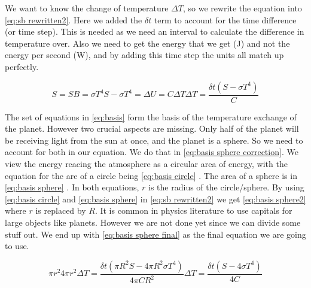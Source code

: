 We want to know the change of temperature $\Delta T$, so we rewrite the equation into \autoref{eq:sb rewritten2}. Here we added the $\delta t$ term to account for the time difference (or time 
step). This is needed as we need an interval to calculate the difference in temperature over. Also we need to get the energy that we get (\si{J}) and not the energy per second (\si{W}), and by 
adding this time step the units all match up perfectly.

\begin{subequations}
    \begin{equation}
        S = SB = \sigma T^4
        \label{eq:stefan-boltzmann}
    \end{equation}
    \begin{equation}
        S - \sigma T^4 = \Delta U = C \Delta T
        \label{eq:sb rewritten}
    \end{equation}
    \begin{equation}
        \Delta T = \frac{\delta t(S - \sigma T^4)}{C}
        \label{eq:sb rewritten2}
    \end{equation}
    \label{eq:basis}
\end{subequations}

The set of equations in \autoref{eq:basis} form the basis of the temperature exchange of the planet. However two crucial aspects are missing. Only half of the planet will be receiving light from 
the sun at once, and the planet is a sphere. So we need to account for both in our equation. We do that in \autoref{eq:basis sphere correction}. We view the energy reacing the atmosphere as a 
circular area of energy, with the equation for the are of a circle being \autoref{eq:basis circle} \cite{areaCircle}. The area of a sphere is in \autoref{eq:basis sphere} \cite{areaSphere}. In 
both equations, $r$ is the radius of the circle/sphere. By using \autoref{eq:basis circle} and \autoref{eq:basis sphere} in \autoref{eq:sb rewritten2} we get \autoref{eq:basis sphere2} where 
$r$ is replaced by $R$. It is common in physics literature to use capitals for large objects like planets. However we are not done yet since we can divide some stuff out. We end up with 
\autoref{eq:basis sphere final} as the final equation we are going to use.

\begin{subequations}
    \begin{equation}
        \pi r^2
        \label{eq:basis circle}
    \end{equation}
    \begin{equation}
        4 \pi r^2
        \label{eq:basis sphere}
    \end{equation}
    \begin{equation}
        \Delta T = \frac{\delta t (\pi R^2S - 4\pi R^2\sigma T^4)}{4\pi CR^2}
        \label{eq:basis sphere2}
    \end{equation}
    \begin{equation}
        \Delta T = \frac{\delta t (S - 4\sigma T^4)}{4C}
        \label{eq:basis sphere final}
    \end{equation}
    \label{eq:basis sphere correction}
\end{subequations}

